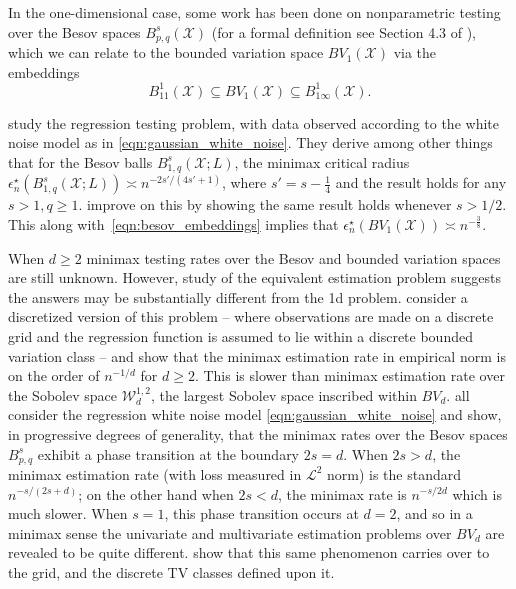 \documentclass{article}
\newcommand{\1}{\mathbf{1}}
\theoremstyle{alden}
\theoremstyle{aldenthm}
\theoremstyle{definition}
\theoremstyle{remark}
\begin{document}
In the one-dimensional case, some work has been done on nonparametric testing over the Besov spaces $B_{p,q}^s(\mathcal{X})$ (for a formal definition see Section 4.3 of \cite{gine16}), which we can relate to the bounded variation space $BV_1(\mathcal{X})$ via the embeddings
\begin{equation}
\label{eqn:besov_embeddings}
B_{11}^1(\mathcal{X}) \subseteq BV_1(\mathcal{X}) \subseteq B_{1\infty}^1(\mathcal{X}).
\end{equation}

\citet{lepski1999} study the regression testing problem, with data observed according to the white noise model as in \eqref{eqn:gaussian_white_noise}. They derive among other things that for the Besov balls $B_{1,q}^s(\mathcal{X}; L)$, the minimax critical radius $\epsilon_n^{\star}(B_{1,q}^s(\mathcal{X}; L)) \asymp n^{-2s'/(4s' + 1)}$, where $s' = s - \frac{1}{4}$ and the result holds for any $s > 1, q \geq 1$. \citet{ingster00} improve on this by showing the same result holds whenever $s > 1/2$. This along with~\eqref{eqn:besov_embeddings} implies that $\epsilon_n^{\star}(BV_1(\mathcal{X})) \asymp n^{-\frac{3}{8}}$. 

When $d \geq 2$ minimax testing rates over the Besov and bounded variation spaces are still unknown. However, study of the equivalent estimation problem suggests the answers may be substantially different from the 1d problem. \citet{sadhanala16} consider a discretized version of this problem -- where observations are made on a discrete grid and the regression function is assumed to lie within a discrete bounded variation class -- and show that the minimax estimation rate in empirical norm is on the order of $n^{-1/d}$ for $d \geq 2$. This is slower than minimax estimation rate over the Sobolev space $\mathcal{W}_d^{1,2}$, the largest Sobolev space inscribed within $BV_d$. \citet{delyon96,kerkyacharian08,lepski2015,ruiz18} all consider the regression white noise model \eqref{eqn:gaussian_white_noise} and show, in progressive degrees of generality, that the minimax rates over the Besov spaces $B_{p,q}^s$ exhibit a phase transition at the boundary $2s = d$. When $2s > d$, the minimax estimation rate (with loss measured in $\mathcal{L}^2$ norm) is the standard $n^{-s/(2s + d)}$; on the other hand when $2s < d$, the minimax rate is $n^{-s/2d}$ which is much slower. When $s = 1$, this phase transition occurs at $d = 2$, and so in a minimax sense the univariate and multivariate estimation problems over $BV_d$ are revealed to be quite different. \citet{sadhanala17} show that this same phenomenon carries over to the grid, and the discrete TV classes defined upon it. 
\end{document}
